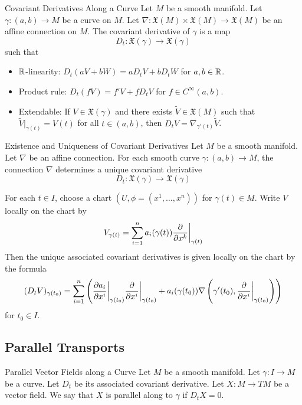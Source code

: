 \documentclass[a4paper]{article}
\begin{document}
\begin{defn}{Covariant Derivatives Along a Curve}{} Let $M$ be a smooth manifold. Let $\gamma:(a,b)\to M$ be a curve on $M$. Let $\nabla:\mathfrak{X}(M)\times\mathfrak{X}(M)\to\mathfrak{X}(M)$ be an affine connection on $M$. The covariant derivative of $\gamma$ is a map $$D_t:\mathfrak{X}(\gamma)\to\mathfrak{X}(\gamma)$$ such that 
\begin{itemize}
\item $\mathbb{R}$-linearity: $D_t(aV+bW)=aD_tV+bD_tW$ for $a,b\in\mathbb{R}$. 
\item Product rule: $D_t(fV)=f'V+fD_tV$ for $f\in C^\infty(a,b)$. 
\item Extendable: If $V\in\mathfrak{X}(\gamma)$ and there exists $\tilde{V}\in\mathfrak{X}(M)$ such that $\tilde{V}|_{\gamma(t)}=V(t)$ for all $t\in(a,b)$, then $D_tV=\nabla_{\gamma'(t)}\tilde{V}$. 
\end{itemize}
\end{defn}

\begin{thm}{Existence and Uniqueness of Covariant Derivatives}{} Let $M$ be a smooth manifold. Let $\nabla$ be an affine connection. For each smooth curve $\gamma:(a,b)\to M$, the connection $\nabla$ determines a unique covariant derivative $$D_t:\mathfrak{X}(\gamma)\to\mathfrak{X}(\gamma)$$

For each $t\in I$, choose a chart $(U,\phi=(x^1,\dots,x^n))$ for $\gamma(t)\in M$. Write $V$ locally on the chart by $$V_{\gamma(t)}=\sum_{i=1}^na_i(\gamma(t))\frac{\partial}{\partial x^k}\bigg{|}_{\gamma(t)}$$ Then the unique associated covariant derivatives is given locally on the chart by the formula $$(D_tV)_{\gamma(t_0)}=\sum_{i=1}^n\left(\frac{\partial a_i}{\partial x^i}\bigg{|}_{\gamma(t_0)}\frac{\partial}{\partial x^i}\bigg{|}_{\gamma(t_0)}+a_i(\gamma(t_0))\nabla\left(\gamma'(t_0),\frac{\partial}{\partial x^i}\bigg{|}_{\gamma(t_0)}\right)\right)$$ for $t_0\in I$. 
\end{thm}

\subsection{Parallel Transports}
\begin{defn}{Parallel Vector Fields along a Curve}{} Let $M$ be a smooth manifold. Let $\gamma:I\to M$ be a curve. Let $D_t$ be its associated covariant derivative. Let $X:M\to TM$ be a vector field. We say that $X$ is parallel along to $\gamma$ if $D_tX=0$. 
\end{defn}
\end{document}
